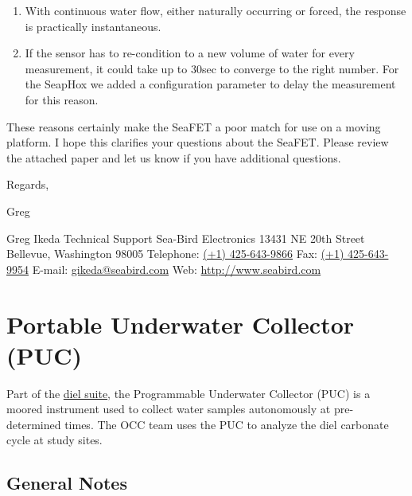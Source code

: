 \documentclass[
]{book}
\begin{document}
\begin{enumerate}
\def\labelenumi{\alph{enumi})}
\item
  With continuous water flow, either naturally occurring or forced, the response is practically instantaneous.
\item
  If the sensor has to re-condition to a new volume of water for every measurement, it could take up to 30sec to converge to the right number. For the SeapHox we added a configuration parameter to delay the measurement for this reason.
\end{enumerate}

These reasons certainly make the SeaFET a poor match for use on a moving platform. I hope this clarifies your questions about the SeaFET. Please review the attached paper and let us know if you have additional questions.

Regards,

Greg

Greg Ikeda
Technical Support
Sea-Bird Electronics
13431 NE 20th Street
Bellevue, Washington 98005
Telephone: \href{nulltel:\%28\%2B1\%29\%20425-643-9866}{(+1) 425-643-9866}
Fax: \href{nulltel:\%28\%2B1\%29\%20425-643-9954}{(+1) 425-643-9954}
E-mail: \href{nullmailto:gikeda@seabird.com}{gikeda@seabird.com}
Web: \href{http://www.seabird.com/}{http://www.seabird.com}

\hypertarget{puc}{%
\chapter{Portable Underwater Collector (PUC)}\label{puc}}

Part of the \protect\hyperlink{dielsuite}{diel suite}, the Programmable Underwater Collector (PUC) is a moored instrument used to collect water samples autonomously at pre-determined times. The OCC team uses the PUC to analyze the diel carbonate cycle at study sites.

\hypertarget{general-notes}{%
\section{General Notes}\label{general-notes}}
\end{document}
